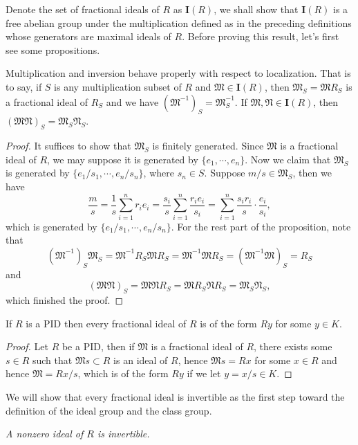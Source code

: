 Denote the set of fractional ideals of $R$ as $\mathbf{I}(R)$, we shall show that $\mathbf{I}(R)$ is a free abelian group under the multiplication defined as in the preceding definitions whose generators are maximal ideals of $R$. Before proving this result, let's first see some propositions.
\begin{proposition}
Multiplication and inversion behave properly with respect to localization. That is to say, if $S$ is any multiplication subset of $R$ and $\mathfrak{M}\in\mathbf{I}(R)$, then $\mathfrak{M}_S=\mathfrak{M}R_S$ is a fractional ideal of $R_S$ and we have $(\mathfrak{M}^{-1})_S=\mathfrak{M}_S^{-1}$. If $\mathfrak{M},\mathfrak{N}\in\mathbf{I}(R)$, then $(\mathfrak{MN})_S=\mathfrak{M}_S\mathfrak{N}_S$.
\end{proposition}
\begin{proof}
It suffices to show that $\mathfrak{M}_S$ is finitely generated. Since $\mathfrak{M}$ is a fractional ideal of $R$, we may suppose it is generated by $\{e_1,\cdots,e_n\}$. Now we claim that $\mathfrak{M}_S$ is generated by $\{e_1/s_1,\cdots,e_n/s_n\}$, where $s_n\in S$. Suppose $m/s\in\mathfrak{M}_S$, then we have 
$$
\frac{m}{s}=\frac{1}{s}\sum_{i=1}^n{r_ie_i}=\frac{s_i}{s}\sum_{i=1}^n{\frac{r_ie_i}{s_i}}=\sum_{i=1}^n{\frac{s_ir_i}{s}\cdot \frac{e_i}{s_i}},
$$
which is generated by $\{e_1/s_1,\cdots,e_n/s_n\}$. For the rest part of the proposition, note that 
$$
\left( \mathfrak{M} ^{-1} \right) _S\mathfrak{M} _S=\mathfrak{M} ^{-1}R_S\mathfrak{M} R_S=\mathfrak{M} ^{-1}\mathfrak{M} R_S=\left( \mathfrak{M} ^{-1}\mathfrak{M} \right) _S=R_S
$$
and 
$$
\left( \mathfrak{M} \mathfrak{N} \right) _S=\mathfrak{M} \mathfrak{N} R_S=\mathfrak{M} R_S\mathfrak{N} R_S=\mathfrak{M} _S\mathfrak{N} _S,
$$
which finished the proof.
\end{proof}
\begin{proposition}
If $R$ is a PID then every fractional ideal of $R$ is of the form $Ry$ for some $y\in K$.
\end{proposition}
\begin{proof}
Let $R$ be a PID, then if $\mathfrak{M}$ is a fractional ideal of $R$, there exists some $s\in R$ such that $\mathfrak{M}s\subset R$ is an ideal of $R$, hence $\mathfrak{M}s=Rx$ for some $x\in R$ and hence $\mathfrak{M}=Rx/s$, which is of the form $Ry$ if we let $y=x/s\in K$.
\end{proof}
We will show that every fractional ideal is invertible as the first step toward the definition of the ideal group and the class group.
\begin{lemma}\em
A nonzero ideal of $R$ is invertible.
\end{lemma}
